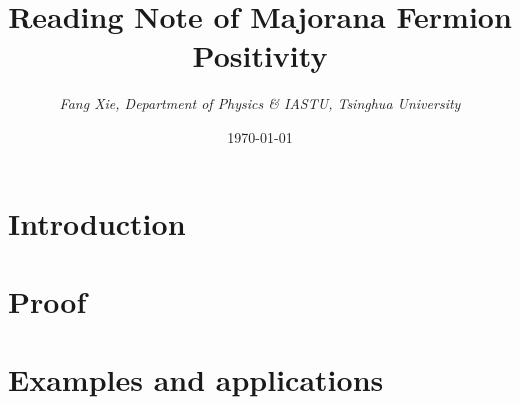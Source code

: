 \documentclass{article}
\author{\emph{Fang Xie, Department of Physics \& IASTU, Tsinghua University}}
\title{{\bf{Reading Note of Majorana Fermion Positivity}}}
\date{\today}
\begin{document}
\maketitle
\section{Introduction}

\section{Proof}

\section{Examples and applications}
\end{document}

